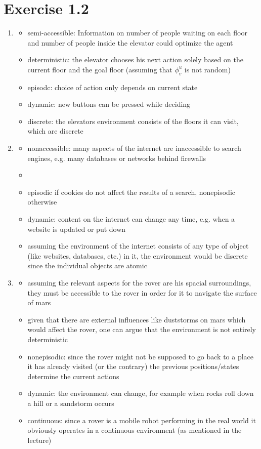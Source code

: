 \documentclass{article}
\begin{document}
\section*{Exercise 1.2}
\begin{enumerate}[label=(\alph*)]
	\item	\begin{itemize}
				\item	semi-accessible: Information on number of people waiting on each floor and number of people inside the elevator could optimize the agent
				\item	deterministic: the elevator chooses his next action solely based on the current floor and the goal floor (assuming that $\phi^u_v$ is not random)
				\item	episodc: choice of action only depends on current state
				\item	dynamic: new buttons can be pressed while deciding
				\item	discrete: the elevators environment consists of the floors it can visit, which are discrete
			\end{itemize}
	\item	\begin{itemize}
				\item nonaccessible: many aspects of the internet are inaccessible to search engines, e.g. many databases or networks behind firewalls
				\item
				\item episodic if cookies do not affect the results of a search, nonepisodic otherwise
				\item dynamic: content on the internet can change any time, e.g. when a website is updated or put down
				\item assuming the environment of the internet consists of any type of object (like websites, databases, etc.) in it, the environment would be discrete since the individual objects are atomic
			\end{itemize}
	\item	\begin{itemize}
				\item assuming the relevant aspects for the rover are his spacial surroundings, they must be accessible to the rover in order for it to navigate the surface of mars
				\item given that there are external influences like duststorms on mars which would affect the rover, one can argue that the environment is not entirely deterministic
				\item nonepisodic: since the rover might not be supposed to go back to a place it has already visited (or the contrary) the previous positions/states determine the current actions
				\item dynamic: the environment can change, for example when rocks roll down a hill or a sandstorm occurs
				\item continuous: since a rover is a mobile robot performing in the real world it obviously operates in a continuous environment (as mentioned in the lecture)
			\end{itemize}
\end{enumerate}
\end{document}
